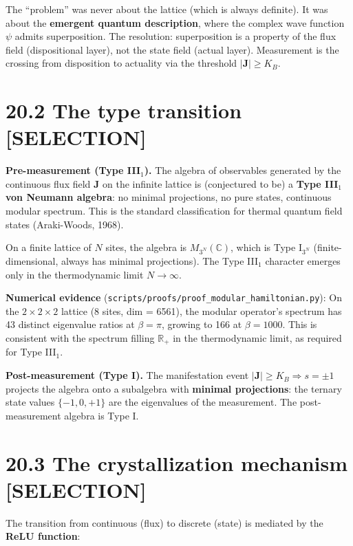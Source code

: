 \documentclass[
  11pt,
  letterpaper,
  twoside,
  openright]{book}
\begin{document}
The ``problem'' was never about the lattice (which is always definite).
It was about the \textbf{emergent quantum description}, where the
complex wave function \(\psi\) admits superposition. The resolution:
superposition is a property of the flux field (dispositional layer), not
the state field (actual layer). Measurement is the crossing from
disposition to actuality via the threshold \(|\mathbf{J}| \geq K_B\).

\section{20.2 The type transition
{[}SELECTION{]}}\label{the-type-transition-selection}

\textbf{Pre-measurement (Type III\(_1\)).} The algebra of observables
generated by the continuous flux field \(\mathbf{J}\) on the infinite
lattice is (conjectured to be) a \textbf{Type III\(_1\) von Neumann
algebra}: no minimal projections, no pure states, continuous modular
spectrum. This is the standard classification for thermal quantum field
states (Araki-Woods, 1968).

On a finite lattice of \(N\) sites, the algebra is
\(M_{3^N}(\mathbb{C})\), which is Type I\(_{3^N}\) (finite-dimensional,
always has minimal projections). The Type III\(_1\) character emerges
only in the thermodynamic limit \(N \to \infty\).

\textbf{Numerical evidence}
(\texttt{scripts/proofs/proof\_modular\_hamiltonian.py}): On the
\(2 \times 2 \times 2\) lattice (8 sites, dim = 6561), the modular
operator's spectrum has 43 distinct eigenvalue ratios at
\(\beta = \pi\), growing to 166 at \(\beta = 1000\). This is consistent
with the spectrum filling \(\mathbb{R}_+\) in the thermodynamic limit,
as required for Type III\(_1\).

\textbf{Post-measurement (Type I).} The manifestation event
\(|\mathbf{J}| \geq K_B \Rightarrow s = \pm 1\) projects the algebra
onto a subalgebra with \textbf{minimal projections}: the ternary state
values \(\{-1, 0, +1\}\) are the eigenvalues of the measurement. The
post-measurement algebra is Type I.

\section{20.3 The crystallization mechanism
{[}SELECTION{]}}\label{the-crystallization-mechanism-selection}

The transition from continuous (flux) to discrete (state) is mediated by
the \textbf{ReLU function}:
\end{document}
